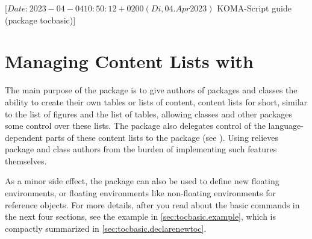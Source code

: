 %
%
%
%
%
%
%

                 [$Date: 2023-04-04 10:50:12 +0200 (Di, 04. Apr 2023) $
                  KOMA-Script guide (package tocbasic)]


\chapter{Managing Content Lists with }
\BeginIndexGroup%
%
%
%
%
The main purpose of the  package is to give authors of
packages and classes the ability to create their own tables or lists of
content, content lists for short, similar to the list of figures and the list
of tables, allowing classes and other packages some control over these lists.
The  package also delegates control of the
language-dependent parts of these content lists to the
 package (see \cite{package:babel}). Using
 relieves package and class authors from the burden of
implementing such features themselves.

As a minor side effect, the package can also be used to define new floating
environments, or floating environments like non-floating environments for
reference objects. For more details, after you read about the basic commands
in the next four sections, see the example in \autoref{sec:tocbasic.example},
which is compactly summarized in \autoref{sec:tocbasic.declarenewtoc}.

